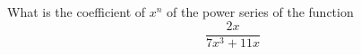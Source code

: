   What is the coefficient of $x^n$ of the power series of the function
  \[
    \frac{2x}{7x^3 + 11x}
  \]
